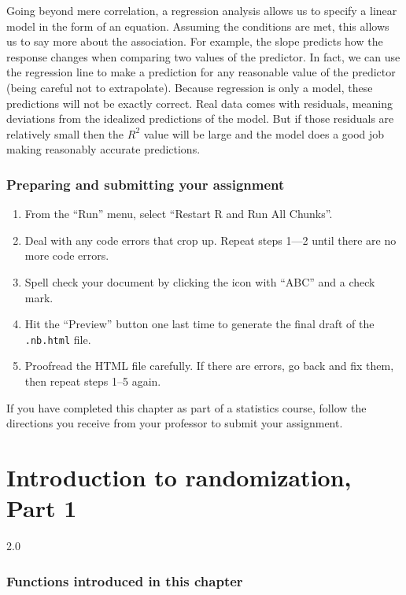 \documentclass[
]{book}
\providecommand{\tightlist}{%
  \setlength{\itemsep}{0pt}\setlength{\parskip}{0pt}}
\begin{document}
Going beyond mere correlation, a regression analysis allows us to specify a linear model in the form of an equation. Assuming the conditions are met, this allows us to say more about the association. For example, the slope predicts how the response changes when comparing two values of the predictor. In fact, we can use the regression line to make a prediction for any reasonable value of the predictor (being careful not to extrapolate). Because regression is only a model, these predictions will not be exactly correct. Real data comes with residuals, meaning deviations from the idealized predictions of the model. But if those residuals are relatively small then the \(R^2\) value will be large and the model does a good job making reasonably accurate predictions.

\hypertarget{regression-prep}{%
\subsection{Preparing and submitting your assignment}\label{regression-prep}}

\begin{enumerate}
\def\labelenumi{\arabic{enumi}.}
\tightlist
\item
  From the ``Run'' menu, select ``Restart R and Run All Chunks''.
\item
  Deal with any code errors that crop up. Repeat steps 1---2 until there are no more code errors.
\item
  Spell check your document by clicking the icon with ``ABC'' and a check mark.
\item
  Hit the ``Preview'' button one last time to generate the final draft of the \texttt{.nb.html} file.
\item
  Proofread the HTML file carefully. If there are errors, go back and fix them, then repeat steps 1--5 again.
\end{enumerate}

If you have completed this chapter as part of a statistics course, follow the directions you receive from your professor to submit your assignment.

\hypertarget{randomization1}{%
\chapter{Introduction to randomization, Part 1}\label{randomization1}}

2.0

\hypertarget{functions-introduced-in-this-chapter-7}{%
\subsection*{Functions introduced in this chapter}\label{functions-introduced-in-this-chapter-7}}
\end{document}
